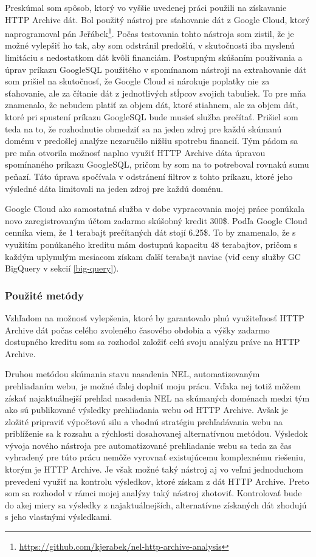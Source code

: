 Preskúmal som spôsob, ktorý vo vyššie uvedenej práci použili na získavanie HTTP Archive dát.
Bol použitý nástroj pre sťahovanie dát z Google Cloud, ktorý naprogramoval pán 
Jeřábek\footnote{\href{https://github.com/kjerabek/nel-http-archive-analysis}{https://github.com/kjerabek/nel-http-archive-analysis}}.
Počas testovania tohto nástroja som zistil, že je možné vylepšiť ho tak, aby som odstránil predošlú, v skutočnosti iba myslenú limitáciu s nedostatkom dát kvôli financiám.
Postupným skúšaním používania a úprav príkazu GoogleSQL použitého v spomínanom nástroji na extrahovanie dát som prišiel na skutočnosť, že Google Cloud
si nárokuje poplatky nie za sťahovanie, ale za čítanie dát z jednotlivých stĺpcov svojich tabuliek.
To pre mňa znamenalo, že nebudem platiť za objem dát, ktoré stiahnem, ale za objem dát, ktoré pri spustení príkazu GoogleSQL bude musieť služba prečítať.
Prišiel som teda na to, že rozhodnutie obmedziť sa na jeden zdroj pre každú skúmanú doménu v predošlej analýze nezaručilo nižšiu spotrebu financií.
Tým pádom sa pre mňa otvorila možnosť naplno využiť HTTP Archive dáta úpravou spomínaného príkazu GoogleSQL, pričom by som na to potreboval rovnakú sumu peňazí.
Táto úprava spočívala v odstránení filtrov z tohto príkazu, ktoré jeho výsledné dáta limitovali na jeden zdroj pre každú doménu.

Google Cloud ako samostatná služba v dobe vypracovania mojej práce ponúkala novo zaregistrovaným účtom zadarmo skúšobný
kredit 300\$. 
Podľa Google Cloud cenníka viem, že 1 terabajt prečítaných dát stojí 6.25\$.
To by znamenalo, že s využitím ponúkaného kreditu mám dostupnú kapacitu 48 terabajtov, 
pričom s každým uplynulým mesiacom získam ďalší terabajt naviac (viď ceny služby GC BigQuery v sekcií \ref{big-query}).

\subsubsection{Použité metódy}

Vzhľadom na možnosť vylepšenia, ktoré by garantovalo plnú využiteľnosť HTTP Archive dát počas celého zvoleného časového obdobia a výšky zadarmo dostupného kreditu
som sa rozhodol založiť celú svoju analýzu práve na HTTP Archive.

Druhou metódou skúmania stavu nasadenia NEL, automatizovaným prehliadaním webu, je možné ďalej doplniť moju prácu.
Vďaka nej totiž môžem získať najaktuálnejší prehľad nasadenia NEL na skúmaných doménach medzi tým ako sú publikované výsledky prehliadania webu od HTTP Archive.
Avšak je zložité pripraviť výpočtovú silu a vhodnú stratégiu prehľadávania webu na priblíženie sa k rozsahu a rýchlosti dosahovanej alternatívnou metódou.
Výsledok vývoja nového nástroja pre automatizované prehliadanie webu sa teda za čas vyhradený pre túto prácu nemôže vyrovnať existujúcemu komplexnému riešeniu, ktorým je HTTP Archive.
Je však možné taký nástroj aj vo veľmi jednoduchom prevedení využiť na kontrolu výsledkov, ktoré získam z dát HTTP Archive.
Preto som sa rozhodol v rámci mojej analýzy taký nástroj zhotoviť.
Kontrolovať bude do akej miery sa výsledky z najaktuálnejších, alternatívne získaných dát zhodujú s jeho vlastnými výsledkami.

